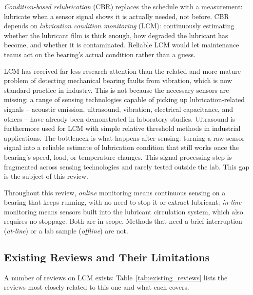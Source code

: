 \textit{Condition-based relubrication} (CBR) replaces the schedule with a measurement: lubricate when a sensor signal shows it is actually needed, not before. CBR depends on \textit{lubrication condition monitoring} (LCM): continuously estimating whether the lubricant film is thick enough, how degraded the lubricant has become, and whether it is contaminated. Reliable LCM would let maintenance teams act on the bearing's actual condition rather than a guess.

LCM has received far less research attention than the related and more mature problem of detecting mechanical bearing faults from vibration, which is now standard practice in industry. This is not because the necessary sensors are missing: a range of sensing technologies capable of picking up lubrication-related signals -- acoustic emission, ultrasound, vibration, electrical capacitance, and others -- have already been demonstrated in laboratory studies. Ultrasound is furthermore used for LCM with simple relative threshold methods in industrial applications. The bottleneck is what happens after sensing: turning a raw sensor signal into a reliable estimate of lubrication condition that still works once the bearing's speed, load, or temperature changes. This signal processing step is fragmented across sensing technologies and rarely tested outside the lab. This gap is the subject of this review.

Throughout this review, \textit{online} monitoring means continuous sensing on a bearing that keeps running, with no need to stop it or extract lubricant; \textit{in-line} monitoring means sensors built into the lubricant circulation system, which also requires no stoppage. Both are in scope. Methods that need a brief interruption (\textit{at-line}) or a lab sample (\textit{offline}) are not.

\subsection{Existing Reviews and Their Limitations}
\label{subsec:existing_reviews}

A number of reviews on LCM exists: Table~\ref{tab:existing_reviews} lists the reviews most closely related to this one and what each covers. 

